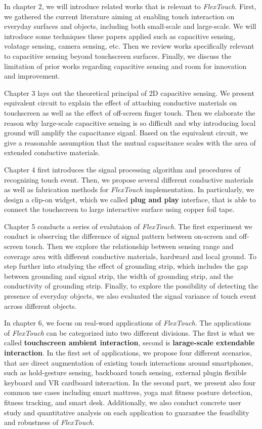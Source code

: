 In chapter 2, we will introduce related works that is relevant to \textit{FlexTouch}. First, we gathered the current literature aiming at enabling touch interaction on everyday surfaces and objects, including both small-scale and large-scale. We will introduce some techniques these papers applied such as capacitive sensing, volatage sensing, camera sensing, etc. Then we review works specifically relevant to capacitive sensing beyond touchscreen surfaces. Finally, we discuss the limitation of prior works regarding capacitive sensing and room for innovation and improvement.

Chapter 3 lays out the theoretical principal of 2D capacitive sensing. We present equivalent circuit to explain the effect of attaching conductive materials on touchscreen as well as the effect of off-screen finger touch. Then we elaborate the reason why large-scale capacitive sensing is so difficult and why introducing local ground will amplify the capacitance siganl. Based on the equivalent circuit, we give a reasonable assumption that the mutual capacitance scales with the area of extended conductive materials.

Chapter 4 first introduces the signal processing algorithm and procedures of recognizing touch event. Then, we propose several different conductive materials as well as fabrication methods for \textit{FlexTouch} implementation. In particularly, we design a clip-on widget, which we called \textbf{plug and play} interface,  that is able to connect the touchscreen to large interactive surface using copper foil tape.

Chapter 5 conducts a series of evalutaion of \textit{FlexTouch}. The first experiment we conduct is observing the difference of signal pattern between on-screen and off-screen touch. Then we explore the relationship between sensing range and coverage area with different conductive materials, hardward and local ground. To step further into studying the effect of grounding strip, which includes the gap between grounding and signal strip, the width of grounding strip, and the conductivity of grounding strip. Finally, to explore the possibility of detecting the presence of everyday objects, we also evaluated the signal variance of touch event across different objects.

In chapter 6, we focus on real-word applications of \textit{FlexTouch}. The applications of \textit{FlexTouch} can be categorized into two different divisions. The first is what we called \textbf{touchscreen ambient interaction}, second is \textbf{larage-scale extendable interaction}. In the first set of applications, we propose four different scenarios, that are direct augmentation of existing touch interactions around smartphones, such as hold-gesture sensing, backboard touch sensing, external plugin flexible keyboard and VR cardboard interaction. In the second part, we present also four common use cases including smart mattress, yoga mat fitness posture detection, fitness tracking, and smart desk. Additionally, we also conduct concrete user study and quantitative analysis on each application to guarantee the feasibility and robustness of \textit{FlexTouch}.  

